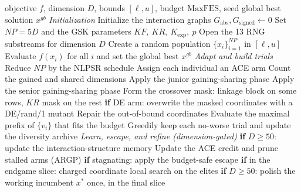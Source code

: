 \begin{algorithm}[p]
\caption{\textbf{Pseudo-code of the DT-GSK algorithm.} The junior and senior
gaining-sharing \emph{vector-update equations} are retained unchanged; the
generation around them is not: crossover masking, tie handling, the population
size, and the senior partition are all modified. The added subsystems and their
fixed execution order are listed in Section~\ref{sec:algorithm}.}
\label{alg:dt-gsk}
\begin{algorithmic}[1]
\Require objective $f$, dimension $D$, bounds $[\ell,u]$, budget $\mathrm{MaxFES}$, seed 
\Ensure global best solution $x^{gb}$
\Statex
\Statex \emph{Initialization}
\State Initialize the interaction graphs $G_{\mathrm{abs}}, G_{\mathrm{signed}} \gets 0$ 
\State Set $NP{=}5D$ and the GSK parameters $KF,\ KR,\ K_{\exp},\ p$
\State Open the 13 RNG substreams for dimension $D$
\State Create a random population $\{x_i\}_{i=1}^{NP}$ in $[\ell,u]$
\State Evaluate $f(x_i)$ for all $i$ and set the global best $x^{gb}$
\Statex
{}
  \Statex
  \Statex \quad\emph{Adapt and build trials}
  \State Reduce $NP$ by the NLPSR schedule 
  \State Assign each individual an ACE arm 
  \State Count the gained and shared dimensions 
  \State Apply the junior gaining-sharing phase
  \State Apply the senior gaining-sharing phase
  \State Form the crossover mask: linkage block on some rows, $KR$ mask on the rest 
  \State \textbf{if} DE arm: overwrite the masked coordinates with a DE/rand/1 mutant 
  \State Repair the out-of-bound coordinates
  \State Evaluate the maximal prefix of $\{v_i\}$ that fits the budget 
  \State Greedily keep each no-worse trial and update the diversity archive 
  \Statex
  \Statex \quad\emph{Learn, escape, and refine \textnormal{(dimension-gated)}}
  \State \textbf{if} $D{\ge}50$: update the interaction-structure memory 
  \State Update the ACE credit and prune stalled arms (ARGP)
  \State \textbf{if} stagnating: apply the budget-safe escape 
  \State \textbf{if} in the endgame slice: charged coordinate local search on the elites
  \State \textbf{if} $D{\ge}50$: polish the working incumbent $x^{*}$ once, in the final slice 

\end{algorithmic}
\end{algorithm}
